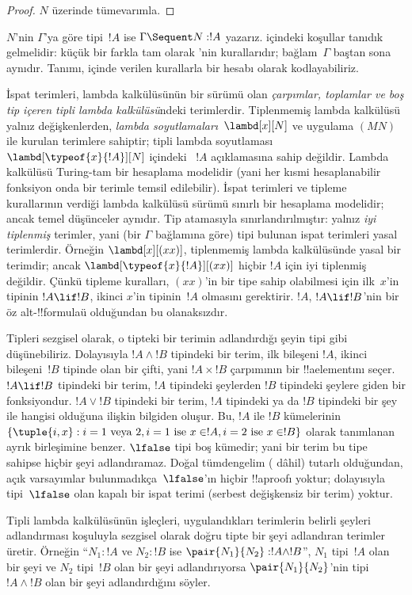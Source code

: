 \documentclass[../../../include/open-logic-section]{subfiles}
\begin{document}
\begin{proof}
  $N$ üzerinde tümevarımla.
\end{proof}

$N$'nin $\Gamma$'ya göre tipi~$!A$ ise $\Gamma \Sequent N : !A$ yazarız.
 içindeki koşullar tanıdık gelmelidir: küçük bir farkla tam
olarak 'nin kurallarıdır; bağlam~$\Gamma$ baştan sona aynıdır.
Tanımı,  içinde verilen kurallarla bir  hesabı
olarak kodlayabiliriz.



İspat terimleri, lambda kalkülüsünün bir sürümü olan \emph{çarpımlar,
toplamlar ve boş tip içeren tipli lambda kalkülüsü}ndeki terimlerdir.
Tiplenmemiş lambda kalkülüsü yalnız değişkenlerden, \emph{lambda
soyutlamaları}~$\lambd[x][N]$ ve uygulama $(MN)$ ile kurulan terimlere
sahiptir; tipli lambda soyutlaması $\lambd[\typeof{x}{!A}][N]$ içindeki
~$!A$ açıklamasına sahip değildir. Lambda kalkülüsü Turing-tam bir hesaplama
modelidir (yani her kısmi hesaplanabilir fonksiyon onda bir terimle temsil
edilebilir). İspat terimleri ve tipleme kurallarının verdiği lambda
kalkülüsü sürümü sınırlı bir hesaplama modelidir; ancak temel düşünceler
aynıdır. Tip atamasıyla sınırlandırılmıştır: yalnız \emph{iyi tiplenmiş}
terimler, yani (bir $\Gamma$ bağlamına göre) tipi bulunan ispat terimleri
yasal terimlerdir. Örneğin $\lambd[x][(xx)]$, tiplenmemiş lambda
kalkülüsünde yasal bir terimdir; ancak $\lambd[\typeof{x}{!A}][(xx)]$ hiçbir
$!A$ için iyi tiplenmiş değildir. Çünkü tipleme kuralları, $(xx)$'in bir
tipe sahip olabilmesi için ilk~$x$'in tipinin $!A \lif !B$, ikinci $x$'in
tipinin~$!A$ olmasını gerektirir. $!A$, $!A \lif !B$'nin bir öz
alt-!!{formula}{}ü olduğundan bu olanaksızdır.

Tipleri sezgisel olarak, o tipteki bir terimin adlandırdığı şeyin tipi gibi
düşünebiliriz. Dolayısıyla $!A \land !B$ tipindeki bir terim, ilk bileşeni
$!A$, ikinci bileşeni~$!B$ tipinde olan bir çifti, yani $!A \times !B$
çarpımının bir !!a{element}{}ını seçer. $!A \lif !B$ tipindeki bir terim,
$!A$ tipindeki şeylerden $!B$ tipindeki şeylere giden bir fonksiyondur.
$!A \lor !B$ tipindeki bir terim, $!A$ tipindeki ya da $!B$ tipindeki bir
şey ile hangisi olduğuna ilişkin bilgiden oluşur. Bu, $!A$ ile $!B$
kümelerinin $\{\tuple{i,x} : i = 1 \text{ veya } 2, i = 1 \text{ ise }
x \in !A, i=2 \text{ ise } x \in !B\}$ olarak tanımlanan ayrık birleşimine
benzer. $\lfalse$ tipi boş kümedir; yani bir terim bu tipe sahipse hiçbir
şeyi adlandıramaz. Doğal tümdengelim ( dâhil) tutarlı olduğundan,
açık varsayımlar bulunmadıkça~$\lfalse$'ın hiçbir !!a{proof}{}ı yoktur;
dolayısıyla tipi~$\lfalse$ olan kapalı bir ispat terimi (serbest değişkensiz
bir terim) yoktur.

Tipli lambda kalkülüsünün işleçleri, uygulandıkları terimlerin belirli
şeyleri adlandırması koşuluyla sezgisel olarak doğru tipte bir şeyi adlandıran
terimler üretir. Örneğin ``$N_1 : !A$ ve $N_2 : !B$ ise
$\pair{N_1}{N_2} : !A \land !B$'', $N_1$ tipi~$!A$ olan bir şeyi ve $N_2$
tipi~$!B$ olan bir şeyi adlandırıyorsa $\pair{N_1}{N_2}$'nin tipi
$!A \land !B$ olan bir şeyi adlandırdığını söyler.
\end{document}
